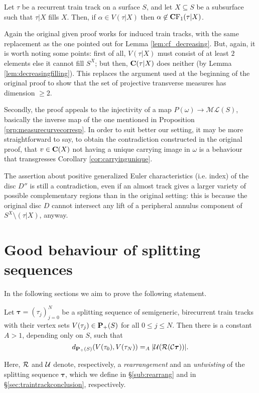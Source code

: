 \begin{lemma}\label{lem:vertexnotinterior}
Let $\tau$ be a recurrent train track on a surface $S$, and let $X\subseteq S$ be a subsurface such that $\tau|X$ fills $X$. Then, if $\alpha \in V(\tau|X)$ then $\alpha\not\in \mathbf C \mathrm F_1(\tau|X)$.
\end{lemma}
Again the original given proof works for induced train tracks, with the same replacement as the one pointed out for Lemma \ref{lem:cf_decreasing}. But, again, it is worth noting some points: first of all, $V(\tau|X)$ must consist of at least $2$ elements else it cannot fill $S^X$; but then, $\mathbf C(\tau|X)$ does neither (by Lemma \ref{lem:decreasingfilling}). This replaces the argument used at the beginning of the original proof to show that the set of projective transverse measures has dimension $\geq 2$.

Secondly, the proof appeals to the injectivity of a map $P(\omega)\rightarrow\mathcal{ML}(S)$, basically the inverse map of the one mentioned in Proposition \ref{prp:measurecurvecorresp}. In order to suit better our setting, it may be more straightforward to say, to obtain the contradiction constructed in the original proof, that $v\in\mathbf C(X)$ not having a unique carrying image in $\omega$ is a behaviour that transgresses Corollary \ref{cor:carryingunique}.

The assertion about positive generalized Euler characteristics (i.e. index) of the disc $D''$ is still a contradiction, even if an almost track gives a larger variety of possible complementary regions than in the original setting: this is because the original disc $D$ cannot intersect any lift of a peripheral annulus component of $S^X\setminus (\tau|X)$, anyway.

\section{Good behaviour of splitting sequences}\label{sub:goodbehaviour}

In the following sections we aim to prove the following statement.
\begin{theo}\label{thm:core}
Let $\bm\tau=(\tau_j)_{j=0}^N$ be a splitting sequence of semigeneric, birecurrent train tracks with their vertex sets $V(\tau_j)\in{\mathbf{P}_+}(S)$ for all $0\leq j\leq N$. Then there is a constant $A>1$, depending only on $S$, such that
$$d_{{\mathbf{P}_+}(S)}(V(\tau_0),V(\tau_N))=_A |{\mathcal U}({\mathcal R}({\mathcal C}\bm\tau))|.$$
\end{theo}
Here, ${\mathcal R}$ and ${\mathcal U}$ denote, respectively, a \emph{rearrangement} and an \emph{untwisting} of the splitting sequence $\bm\tau$, which we define in \S \ref{sub:rearrang} and in \S \ref{sec:traintrackconclusion}, respectively.

